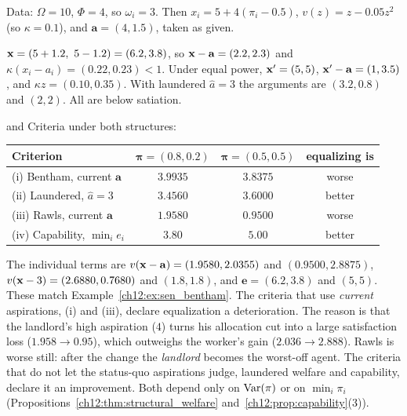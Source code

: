 \documentclass[../solutions_manual.tex]{subfiles}
\begin{document}
Data: $\Omega = 10$, $\Phi = 4$, so $\omega_i = 3$. Then $x_i = 5 + 4(\pi_i - 0.5)$, $v(z) = z - 0.05z^2$ (so $\kappa = 0.1$), and $\mathbf{a} = (4, 1.5)$, taken as given.

 $\mathbf{x} = (5 + 1.2,\ 5 - 1.2) = (6.2, 3.8)$, so $\mathbf{x} - \mathbf{a} = (2.2, 2.3)$ and $\kappa(x_i - a_i) = (0.22, 0.23) < 1$. Under equal power, $\mathbf{x}' = (5,5)$, $\mathbf{x}' - \mathbf{a} = (1, 3.5)$, and $\kappa z = (0.10, 0.35)$. With laundered $\hat a = 3$ the arguments are $(3.2, 0.8)$ and $(2, 2)$. All are below satiation.

 and  Criteria under both structures:
\begin{center}
\small
\begin{tabular}{lccc}
\toprule
Criterion & $\boldsymbol{\pi} = (0.8, 0.2)$ & $\boldsymbol{\pi} = (0.5, 0.5)$ & equalizing is \\
\midrule
(i) Bentham, current $\mathbf{a}$ & $3.9935$ & $3.8375$ & worse \\
(ii) Laundered, $\hat a = 3$ & $3.4560$ & $3.6000$ & better \\
(iii) Rawls, current $\mathbf{a}$ & $1.9580$ & $0.9500$ & worse \\
(iv) Capability, $\min_i e_i$ & $3.80$ & $5.00$ & better \\
\bottomrule
\end{tabular}
\end{center}
The individual terms are $v(\mathbf{x} - \mathbf{a}) = (1.9580, 2.0355)$ and $(0.9500, 2.8875)$, $v(\mathbf{x} - 3) = (2.6880, 0.7680)$ and $(1.8, 1.8)$, and $\mathbf{e} = (6.2, 3.8)$ and $(5, 5)$.
These match Example~\ref{ch12:ex:sen_bentham}. The criteria that use \emph{current} aspirations, (i) and (iii), declare equalization a deterioration. The reason is that the landlord's high aspiration ($4$) turns his allocation cut into a large satisfaction loss ($1.958 \to 0.95$), which outweighs the worker's gain ($2.036 \to 2.888$). Rawls is worse still: after the change the \emph{landlord} becomes the worst-off agent. The criteria that do not let the status-quo aspirations judge, laundered welfare and capability, declare it an improvement. Both depend only on $\operatorname{Var}(\pi)$ or on $\min_i\pi_i$ (Propositions~\ref{ch12:thm:structural_welfare} and~\ref{ch12:prop:capability}(3)).
\end{document}
